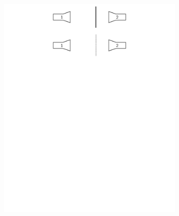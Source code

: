 \begin{figure}[ht]
    \centering
    \begin{subfigure}[b]{0.99\textwidth}
        \includegraphics[page = 1, width=\textwidth, trim = 0cm 14.75cm 0cm 2.5cm, clip]{Abbildungen/Kapitel4/Einfuegungsmessung.pdf}
        \caption{\label{subfig:4_Einfuegungsmessung_Fall1}}
    \end{subfigure}
    \vspace{0.5cm}
    \begin{subfigure}[b]{0.99\textwidth}

\end{subfigure}
\end{figure}
